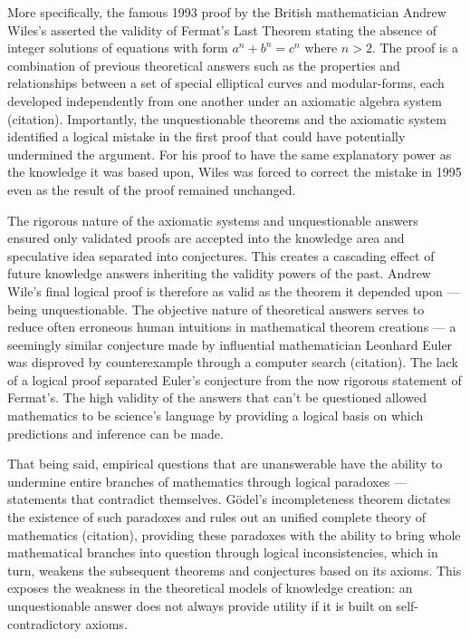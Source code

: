 \documentclass[a4paper,12pt]{article}
\begin{document}
More specifically, the famous 1993 proof by the British mathematician Andrew Wiles's asserted the validity of Fermat's Last Theorem stating the absence of integer solutions of equations with form $a^n + b^n = c^n$ where $n > 2$. The proof is a combination of previous theoretical answers such as the properties and relationships between a set of special elliptical curves and modular-forms, each developed independently from one another under an axiomatic algebra system (citation). Importantly, the unquestionable theorems and the axiomatic system identified a logical mistake in the first proof that could have potentially undermined the argument. For his proof to have the same explanatory power as the knowledge it was based upon, Wiles was forced to correct the mistake in 1995 even as the result of the proof remained unchanged.

The rigorous nature of the axiomatic systems and unquestionable answers ensured only validated proofs are accepted into the knowledge area and speculative idea separated into conjectures. This creates a cascading effect of future knowledge answers inheriting the validity powers of the past. Andrew Wile's final logical proof is therefore as valid as the theorem it depended upon --- being unquestionable. The objective nature of theoretical answers serves to reduce often erroneous human intuitions in mathematical theorem creations --- a seemingly similar conjecture made by influential mathematician Leonhard Euler was disproved by counterexample through a computer search (citation). The lack of a logical proof separated Euler's conjecture from the now rigorous statement of Fermat's. The high validity of the answers that can't be questioned allowed mathematics to be science's language by providing a logical basis on which predictions and inference can be made.

That being said, empirical questions that are unanswerable have the ability to undermine entire branches of mathematics through logical paradoxes --- statements that contradict themselves. G\"odel's incompleteness theorem dictates the existence of such paradoxes and rules out an unified complete theory of mathematics (citation), providing these paradoxes with the ability to bring whole mathematical branches into question through logical inconsistencies, which in turn, weakens the subsequent theorems and conjectures based on its axioms. This exposes the weakness in the theoretical models of knowledge creation: an unquestionable answer does not always provide utility if it is built on self-contradictory axioms.
\end{document}
